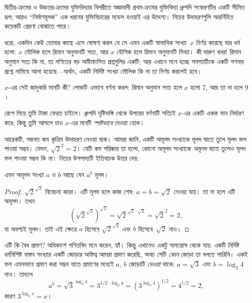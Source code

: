 \documentclass[../../../include/open-logic-section]{subfiles}
\begin{document}


দ্বিতীয়-ক্রমের ও উচ্চতর-ক্রমের যুক্তিবিদ্যার বিপরীতে স্বজ্ঞাবাদী
প্রথম-ক্রমের যুক্তিবিদ্যা ধ্রুপদি সংস্করণটির একটি সীমিত রূপ; আরও
“নির্মাণমূলক” এক ধরনের যুক্তিবিচারের মডেল হওয়াই এর উদ্দেশ্য। নিচের
উদাহরণগুলি অন্তর্নিহিত কয়েকটি প্রেরণা বোঝাতে পারে।

ধরো, একদিন কেউ তোমার কাছে এসে ঘোষণা করল যে সে এমন একটি স্বাভাবিক
সংখ্যা~$x$ নির্ণয় করেছে যার ধর্ম হলো: $x$ মৌলিক হলে রিমান অনুমানটি
সত্য, আর $x$ যৌগিক হলে রিমান অনুমানটি মিথ্যা। কী দারুণ খবর!{} রিমান
অনুমান সত্য কি না, তা গণিতের বড় অমীমাংসিত প্রশ্নগুলির একটি; আর এখানে
মনে হচ্ছে সমস্যাটিকে একটি গণনার প্রশ্নে নামিয়ে আনা হয়েছে---অর্থাৎ,
একটি নির্দিষ্ট সংখ্যা মৌলিক কি না তা নির্ণয় করলেই হবে।

$x$-এর সেই জাদুকরি মানটি কী? লোকটি এভাবে বর্ণনা করল: রিমান অনুমান
সত্য হলে $x$ হলো $7$, আর তা না হলে $9$।

রেগে গিয়ে তুমি টাকা ফেরত চাইলে। ধ্রুপদি দৃষ্টিভঙ্গি থেকে উপরের
বর্ণনাটি সত্যিই $x$-এর একটি একক মান নির্ধারণ করে; কিন্তু তুমি আসলে
চাও $x$-এর মানটি \emph{স্পষ্টভাবে} দেওয়া হোক।

আরেকটি, সম্ভবত কম কৃত্রিম উদাহরণ নেওয়া যাক। আমরা জানি, একটি অমূলদ
সংখ্যাকে মূলদ ঘাতে তুলে মূলদ ফল পাওয়া সম্ভব। যেমন,
$\sqrt{2}^2 = 2$। যেটি কম পরিষ্কার তা হলো, কোনো অমূলদ সংখ্যাকে
\emph{অমূলদ} ঘাতে তুলেও মূলদ ফল পাওয়া সম্ভব কি না। নিচের উপপাদ্যটি
ইতিবাচক উত্তর দেয়:

\begin{thm}
এমন অমূলদ সংখ্যা $a$ ও $b$ আছে যেন $a^b$ মূলদ।
\end{thm}

\begin{proof}
$\sqrt{2}^{\sqrt{2}}$ বিবেচনা করো। এটি মূলদ হলে কাজ শেষ: $a = b =
\sqrt{2}$ নেওয়া যায়। তা না হলে এটি অমূলদ। তখন
\[
(\sqrt{2}^{\sqrt{2}})^{\sqrt{2}} = \sqrt{2}^{\sqrt{2} \cdot
  \sqrt{2}} = \sqrt{2}^2 = 2,
\]
যা অবশ্যই মূলদ। তাই এই ক্ষেত্রে $a$ হিসেবে
$\sqrt{2}^{\sqrt{2}}$ এবং $b$ হিসেবে~$\sqrt 2$ নাও।
\end{proof}

এটি কি বৈধ প্রমাণ? অধিকাংশ গণিতবিদ মনে করেন, হ্যাঁ। কিন্তু এখানেও
একটু অসন্তোষ থেকে যায়: একটি নির্দিষ্ট ধর্মবিশিষ্ট বাস্তব সংখ্যার
একটি জোড়ার অস্তিত্ব আমরা প্রমাণ করেছি, অথচ সেটি \emph{কোন} জোড়া তা
বলতে পারিনি। একই ফল এমনভাবে প্রমাণ করা সম্ভব যাতে প্রমাণের মধ্যেই
$a$, $b$ জোড়াটি \emph{দেওয়া} থাকে: $a = \sqrt{3}$ এবং $b = \log_3
4$ নাও। তাহলে
\[
a^b = \sqrt{3}^{\log_3 4} = 3^{1/2 \cdot \log_3 4} = (3^{\log_3
  4})^{1/2} = 4^{1/2}= 2,
\]
কারণ $3^{\log_3 x} = x$।
\end{document}

